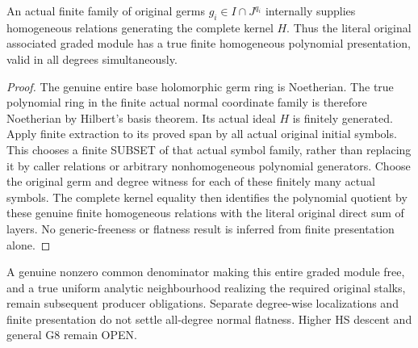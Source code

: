\begin{theorem}
\label{hir:relative-normal-graded-internal-finite-relations}
\leanok
{}
An actual finite family of original germs $g_i\in I\cap J^{q_i}$
internally supplies homogeneous relations generating the complete kernel
$H$. Thus the literal original associated graded module has a true finite
homogeneous polynomial presentation, valid in all degrees simultaneously.
\end{theorem}
\begin{proof}
The genuine entire base holomorphic germ ring is Noetherian. The true
polynomial ring in the finite actual normal coordinate family is therefore
Noetherian by Hilbert's basis theorem. Its actual ideal $H$ is finitely
generated. Apply finite extraction to its proved span by all actual
original initial symbols. This chooses a finite SUBSET of that actual
symbol family, rather than replacing it by caller relations or arbitrary
nonhomogeneous polynomial generators. Choose the original germ and degree
witness for each of these finitely many actual symbols. The complete
kernel equality then identifies the polynomial quotient by these genuine
finite homogeneous relations with the literal original direct sum of
layers. No generic-freeness or flatness result is inferred from finite
presentation alone.
\end{proof}

\begin{remark}
A genuine nonzero common denominator making this entire graded module free,
and a true uniform analytic neighbourhood realizing the required original
stalks, remain subsequent producer obligations. Separate degree-wise
localizations and finite presentation do not settle all-degree normal
flatness. Higher HS descent and general G8 remain OPEN.
\end{remark}

